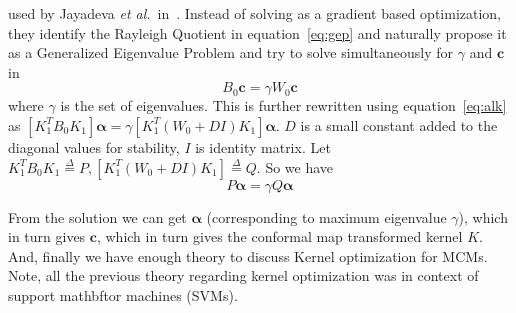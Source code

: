 \documentclass[11pt]{article}
\newcommand{\etal}{{\em et al.}}
\begin{document}
used by Jayadeva \etal\ in~\cite{keropt}. Instead of solving as a gradient based
optimization, they identify the Rayleigh Quotient in equation~\ref{eq:gep} and
naturally propose it as a Generalized Eigenvalue Problem and try to solve
simultaneously for $\gamma$ and $\mathbf{c}$ in
\[B_0\mathbf{c}=\gamma W_0\mathbf{c}
\]
where $\gamma$ is the set of eigenvalues. This is further rewritten using
equation~\ref{eq:alk} as $[K_1^TB_0K_1]\mathbf{\alpha}=\gamma[K_1^T(W_0+DI)K_1]\mathbf{\alpha}$.
$D$ is a small constant added to the diagonal values for stability, $I$ is
identity matrix. Let $K_1^TB_0K_1\stackrel{\Delta}{=}P,
[K_1^T(W_0+DI)K_1]\stackrel{\Delta}{=}Q$. So we have 
\begin{equation}
    \label{eq:GEP}P\mathbf{\alpha}=\gamma Q\mathbf{\alpha}
\end{equation}\par
From the solution we can get $\mathbf{\alpha}$ (corresponding to maximum eigenvalue
$\gamma$), which in turn gives $\mathbf{c}$, which in turn gives the conformal
map transformed kernel $K$. And, finally we have enough theory to discuss Kernel
optimization for MCMs. Note, all the previous theory regarding kernel
optimization was in context of support mathbftor machines (SVMs).
\end{document}
